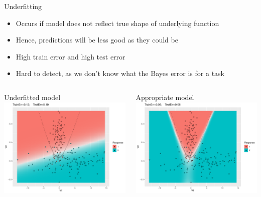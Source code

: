 \documentclass[11pt,compress,t,notes=noshow, xcolor=table]{beamer}
\begin{document}
\begin{vbframe}{Underfitting}
\begin{itemize}
  \item Occurs if model does not reflect true shape of underlying
      function
  \item Hence, predictions will be less good as they could be
  \item High train error and high test error
  \item Hard to detect, as we don't know what the Bayes error is for a task
\end{itemize}
\lz
\begin{columns}
\begin{column}{0.5\textwidth}
  \raggedright
  Underfitted model\\
  \includegraphics[width=\textwidth]{figure/eval_ofit_1u}
\end{column}
\begin{column}{0.5\textwidth}
  \raggedright
  Appropriate model\\
  \includegraphics[width=\textwidth]{figure/eval_ofit_1a}
\end{column}
\end{columns}
\end{vbframe}
\end{document}
